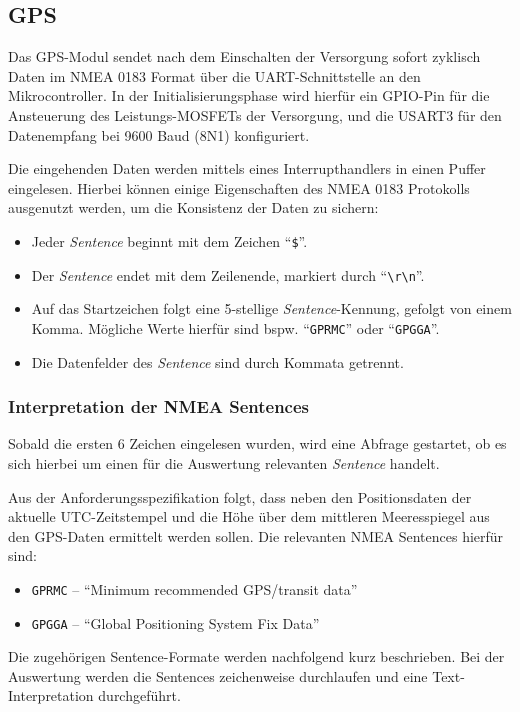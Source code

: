     \subsection{GPS}\label{ssec:GPS}
        Das GPS-Modul sendet nach dem Einschalten der Versorgung sofort zyklisch Daten im NMEA 0183 Format über die UART-Schnittstelle an den Mikrocontroller. In der Initialisierungsphase wird hierfür ein GPIO-Pin für die Ansteuerung des Leistungs-MOSFETs der Versorgung, und die USART3 für den Datenempfang bei 9600 Baud (8N1) konfiguriert.
        
        Die eingehenden Daten werden mittels eines Interrupthandlers in einen Puffer eingelesen. Hierbei können einige Eigenschaften des NMEA 0183 Protokolls ausgenutzt werden, um die Konsistenz der Daten zu sichern:
        \begin{itemize}
            \item Jeder \emph{Sentence} beginnt mit dem Zeichen ``\texttt{\$}''.
            \item Der \emph{Sentence} endet mit dem Zeilenende, markiert durch ``\texttt{\textbackslash r\textbackslash n}''.
            \item Auf das Startzeichen folgt eine 5-stellige \emph{Sentence}-Kennung, gefolgt von einem Komma. Mögliche Werte hierfür sind bspw. ``\texttt{GPRMC}'' oder ``\texttt{GPGGA}''.
            \item Die Datenfelder des \emph{Sentence} sind durch Kommata getrennt.
        \end{itemize}
    
        \subsubsection{Interpretation der NMEA Sentences}
        Sobald die ersten 6 Zeichen eingelesen wurden, wird eine Abfrage gestartet, ob es sich hierbei um einen für die Auswertung relevanten \emph{Sentence} handelt. 
        
        Aus der Anforderungsspezifikation folgt, dass neben den Positionsdaten der aktuelle UTC-Zeitstempel und die Höhe über dem mittleren Meeresspiegel aus den GPS-Daten ermittelt werden sollen. Die relevanten NMEA Sentences hierfür sind:
        \begin{itemize}
            \item \texttt{GPRMC} -- ``Minimum recommended GPS/transit data''
            \item \texttt{GPGGA} -- ``Global Positioning System Fix Data''
        \end{itemize}
        Die zugehörigen Sentence-Formate werden nachfolgend kurz beschrieben. Bei der Auswertung werden die Sentences zeichenweise durchlaufen und eine Text-Interpretation durchgeführt.
        
